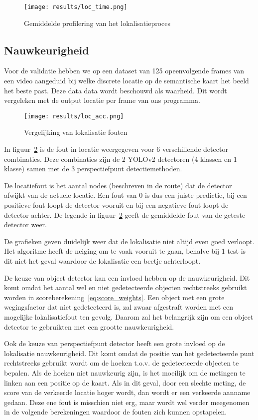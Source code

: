 \begin{figure}[h]
    \centering
    \texttt{[image: results/loc\_time.png]}
    \caption{Gemiddelde profilering van het lokalisatieproces}
    \label{fig:loc_time}
\end{figure}


\subsection{Nauwkeurigheid}
Voor de validatie hebben we op een dataset van 125 opeenvolgende frames van een video aangeduid bij welke discrete locatie op de semantische kaart
het beeld het beste past.
Deze data data wordt beschouwd als waarheid.
Dit wordt vergeleken met de output locatie per frame van ons programma.

\begin{figure}[h]
    \texttt{[image: results/loc\_acc.png]}
    \caption{Vergelijking van lokalisatie fouten}
    \label{fig:loc_acc}
\end{figure}

In figuur~\ref{fig:loc_acc} is de fout in locatie weergegeven voor 6 verschillende detector combinaties.
Deze combinaties zijn de 2 YOLOv2 detectoren (4 klassen en 1 klasse) samen met de 3 perspectiefpunt detectiemethoden.

De locatiefout is het aantal nodes (beschreven in de route) dat de detector afwijkt van de actuele locatie.
Een fout van 0 is dus een juiste predictie, bij een positieve fout loopt de detector vooruit en bij een negatieve fout loopt de detector achter.
De legende in figuur~\ref{fig:loc_acc} geeft de gemiddelde fout van de geteste detector weer.

De grafieken geven duidelijk weer dat de lokalisatie niet altijd even goed verloopt.
Het algoritme heeft de neiging om te vaak vooruit te gaan, behalve bij 1 test is dit niet het geval waardoor de lokalisatie een beetje achterloopt.

De keuze van object detector kan een invloed hebben op de nauwkeurigheid. Dit komt omdat het aantal wel en niet gedetecteerde objecten
rechtstreeks gebruikt worden in scoreberekening~\ref{eq:score_weights}.
Een object met een grote wegingsfactor dat niet gedetecteerd is, zal zwaar afgestraft worden met een mogelijke lokalisatiefout ten gevolg.
Daarom zal het belangrijk zijn om een object detector te gebruikten met een grootte nauwkeurigheid.

Ook de keuze van perspectiefpunt detector heeft een grote invloed op de lokalisatie nauwkeurigheid.
Dit komt omdat de positie van het gedetecteerde punt rechtstreeks gebruikt wordt om de hoeken t.o.v. de gedetecteerde objecten te bepalen.
Als de hoeken niet nauwkeurig zijn, is het moeilijk om de metingen te linken aan een positie op de kaart.
Als in dit geval, door een slechte meting, de score van de verkeerde locatie hoger wordt, dan wordt er een verkeerde aanname gedaan.
Deze ene fout is misschien niet erg, maar wordt wel verder meegenomen in de volgende berekeningen waardoor de fouten zich kunnen opstapelen.

